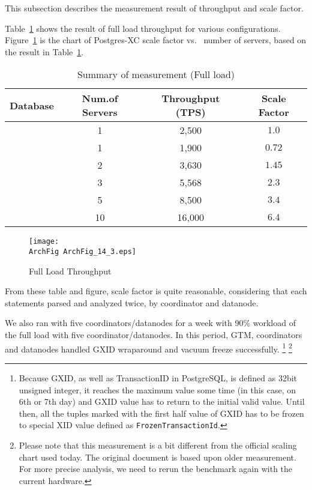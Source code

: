   This subsection describes the measurement result of throughput and scale factor.
  
  Table~\ref{archtab:1} shows the result of full load throughput for various configurations.
  Figure~\ref{archfig:18} is the chart of Postgres-XC scale factor vs.~ number of servers,
  based on the result in Table~\ref{archtab:1}.
  
  \begin{table}[htp]
	  \begin{center}
		  \caption{\label{archtab:1} Summary of measurement (Full load)}
		  \begin{tabular}{|c|c|c|c|} \hline
			  Database & Num.of Servers&Throughput (TPS)&Scale Factor\\\hline
			  \PG&1&2,500&$1.0$\\\hline
			  \XC{}&1&1,900&$0.72$\\\hline
			  \XC{}&2&3,630&$1.45$\\\hline
			  \XC{}&3&5,568&$2.3$\\\hline
			  \XC{}&5&8,500&$3.4$\\\hline
			  \XC{}&10&16,000&$6.4$\\\hline
		  \end{tabular}
	  \end{center}
  \end{table}
  
  
  \begin{figure}[htp]
	  \begin{center}
		  \texttt{[image: \\ArchFig ArchFig\_14\_3.eps]}
		  \caption{\label{archfig:18}\XC{} Full Load Throughput}
	  \end{center}
  \end{figure}
  
  From these table and figure, scale factor is quite reasonable, considering that each statements
  parsed and analyzed twice, by coordinator and datanode.
  
  We also ran \XC{} with five coordinators/datanodes for a week with 90\% workload of
  the full load with five coordinator/datanodes.
  In this period, GTM, coordinators and datanodes handled GXID wraparound and vacuum freeze successfully.%
  \footnote{
  	Because GXID, as well as TransactionID in PostgreSQL, is defined as 32bit unsigned integer,
	it reaches the maximum value some time (in this case, on 6th or 7th day) and GXID value has
	to return to the initial valid value.
  	Until then, all the tuples marked with the first half value of GXID has to be frozen to
	special XID value defined as \texttt{FrozenTransactionId}.
  }
  \footnote{
  	Please note that this measurement is a bit different from the official scaling chart used today.
  	The original document is based upon older measurement.
  	For more precise analysis, we need to rerun the benchmark again with the current hardware.
  }
  
